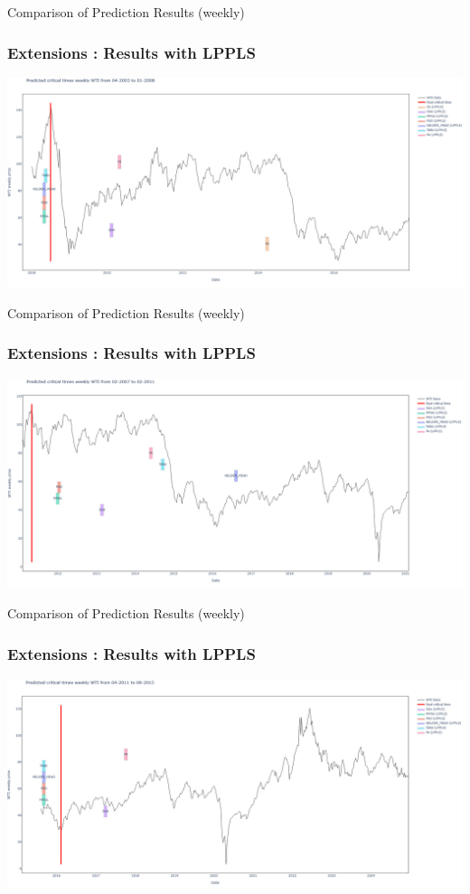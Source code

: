 \documentclass{beamer}
\begin{document}
\begin{frame}{Comparison of Prediction Results (weekly)}
    \frametitle{Extensions : Results with LPPLS}
    \begin{center}
        \includegraphics[width=\textwidth]{plot_overlead/weekly_WTI_1_LPPLS_all_price.png}
    \end{center}
\end{frame}

\begin{frame}{Comparison of Prediction Results (weekly)}
    \frametitle{Extensions : Results with LPPLS}
    \begin{center}
        \includegraphics[width=\textwidth]{plot_overlead/weekly_WTI_2_LPPLS_all_price.png}
    \end{center}
\end{frame}

\begin{frame}{Comparison of Prediction Results (weekly)}
    \frametitle{Extensions : Results with LPPLS}
    \begin{center}
        \includegraphics[width=\textwidth]{plot_overlead/weekly_WTI_3_LPPLS_all_price.png}
    \end{center}
\end{frame}
\end{document}

